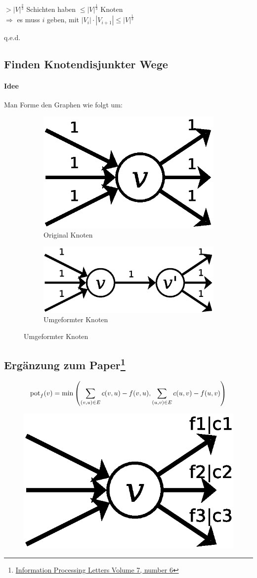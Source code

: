 $>|V|^\frac{2}{3}$ Schichten haben $\leq |V|^\frac{1}{3}$ Knoten\\
$\Rightarrow$ es muss $i$ geben, mit $|V_i|\cdot|V_{i+1}|\leq |V|^\frac{1}{3}$
\begin{flushright}
	q.e.d.
\end{flushright}
\subsection{Finden Knotendisjunkter Wege}
\paragraph{Idee} Man Forme den Graphen wie folgt um:
\begin{figure}[H]
\centering
\begin{subfigure}[H]{0.4\linewidth}
	\centering
\includegraphics[width=0.5\linewidth]{28/Grafik/Diagramm2}
\caption{Original Knoten}
\label{fig:Diagramm2}
\end{subfigure}
\begin{subfigure}[H]{0.4\linewidth}
	\centering
	\includegraphics[width=\linewidth]{28/Grafik/Diagramm3}
	\caption{Umgeformter Knoten}
	\label{fig:Diagramm3}
\end{subfigure}
\end{figure}
\subsection[Ergänzung zum Paper]{Ergänzung zum Paper\footnote{\href{http://www.sciencedirect.com/science/article/pii/0020019078900169}{Information Processing Letters Volume 7, number 6}}}

\[ \text{pot}_f(v)=\min\left( \sum_{(v,u)\in E}c(v,u)-f(v,u),\sum_{(u,v)\in E}c(u,v)-f(u,v) \right) \]
\begin{figure}[h]
\centering
\includegraphics[width=0.2\linewidth]{28/Grafik/Diagramm4}
\caption{}
\label{fig:Diagramm4}
\end{figure}

